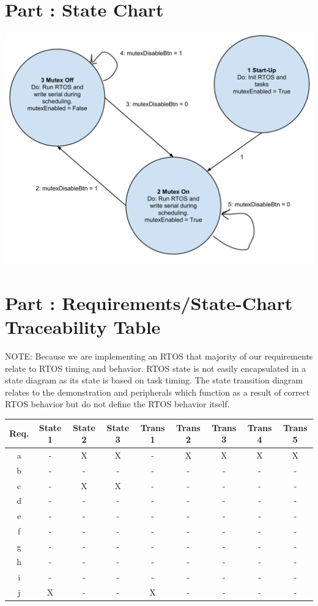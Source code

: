 \documentclass{article}
\newcounter{partNum}
\newcommand{\partNum}{%
        \stepcounter{partNum}%
        \thepartNum}
\newcommand{\sectPart}[1]{\section*{Part \partNum: #1}}
\begin{document}

\sectPart{State Chart}

\begin{center}
    \includegraphics[scale=.5]{RTOS_State_Chart.pdf}
\end{center}

\newpage

\sectPart{Requirements/State-Chart Traceability Table}

NOTE: Because we are implementing an RTOS that majority of our requirements relate to RTOS timing and behavior. RTOS state is not easily encapsulated in a state diagram as its state is based on task timing. The state transition diagram relates to the demonstration and peripherals which function as a result of correct RTOS behavior but do not define the RTOS behavior itself.

\vspace*{1em}

\begin{center}
    \begin{tabular}{| c | c | c | c | c | c | c | c | c |}
        \hline
    Req. & State 1 & State 2 & State 3 & Trans 1 & Trans 2 & Trans 3 & Trans 4 & Trans 5 \\ \hline
    a & - & X & X & - & X & X & X & X \\ \hline
    b & - & - & - & - & - & - & - & - \\ \hline
    c & - & X & X & - & - & - & - & - \\ \hline
    d & - & - & - & - & - & - & - & - \\ \hline
    e & - & - & - & - & - & - & - & - \\ \hline
    f & - & - & - & - & - & - & - & - \\ \hline
    g & - & - & - & - & - & - & - & - \\ \hline
    h & - & - & - & - & - & - & - & - \\ \hline
    i & - & - & - & - & - & - & - & - \\ \hline
    j & X & - & - & X & - & - & - & - \\ \hline
    \end{tabular}
\end{center}
\end{document}
